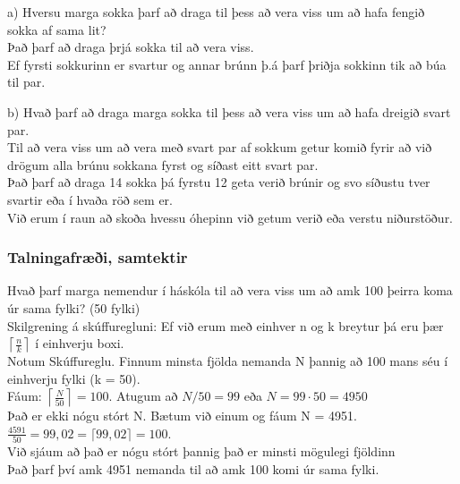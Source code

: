 a) Hversu marga sokka þarf að draga til þess að vera viss um að hafa fengið \hspace*{2.6em}sokka af sama lit?\\
\hspace*{2.6em}Það þarf að draga þrjá sokka til að vera viss.\\
\hspace*{2.6em}Ef fyrsti sokkurinn er svartur og annar brúnn þ.á þarf þriðja sokkinn tik að \hspace*{2.6em}búa til par.\vspace*{0.5em}

b) Hvað þarf að draga marga sokka til þess að vera viss um að hafa dreigið svart \hspace*{2.6em}par.\\
\hspace*{2.6em}Til að vera viss um að vera með svart par af sokkum getur komið fyrir að \hspace*{2.6em}við drögum alla brúnu sokkana fyrst og síðast eitt svart par.\\
\hspace*{2.6em}Það þarf að draga 14 sokka þá fyrstu 12 geta verið brúnir og svo síðustu tver \hspace*{2.6em}svartir eða í hvaða röð sem er.\vspace*{0.5em}\\
Við erum í raun að skoða hvessu óhepinn við getum verið eða verstu niðurstöður.\vspace*{-0.5em}

\subsubsection{Talningafræði, samtektir}
Hvað þarf marga nemendur í háskóla til að vera viss um að amk 100 þeirra koma úr sama fylki? (50 fylki)\vspace*{0.5em}\\
Skilgrening á skúffuregluni: Ef við erum með einhver n og k breytur þá eru þær $\left\lceil \frac{n}{k} \right\rceil$ í einhverju boxi.\vspace*{0.5em}\\
Notum Skúffureglu. Finnum minsta fjölda nemanda N þannig að 100 mans séu í einhverju fylki (k = 50).\vspace*{0.5em}\\
Fáum: $\left\lceil \frac{N}{50} \right\rceil = 100$. Atugum að $N/50 = 99$ eða $N=99\cdot 50 = 4950$\\
Það er ekki nógu stórt N. Bætum við einum og fáum N = 4951.\vspace*{0.5em}\\
$\frac{4591}{50} = 99,02 = \lceil 99,02 \rceil = 100$.\vspace*{0.3em}\\
Við sjáum að það er nógu stórt þannig það er minsti mögulegi fjöldinn\vspace*{0.3em}\\
Það þarf því amk 4951 nemanda til að amk 100 komi úr sama fylki.
\newpage
